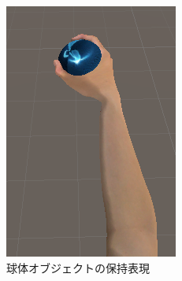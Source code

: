 \documentclass{ltjsreport}
\begin{document}
\begin{figure}[H]
\begin{minipage}{0.18\columnwidth}
		\includegraphics[width = \columnwidth]{../figs/grapsphere_up.png}
		\end{minipage}
		\caption{球体オブジェクトの保持表現}
		\label{fig:spherehold}
		\end{figure}
\end{document}
